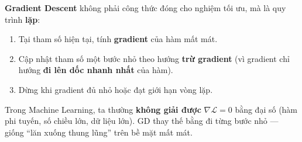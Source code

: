 \begin{dongco}[title={Bản chất Gradient Descent}]
\textbf{Gradient Descent} không phải công thức đóng cho nghiệm tối ưu, mà là quy trình \textbf{lặp}:
\begin{enumerate}
  \item Tại tham số hiện tại, tính \textbf{gradient} của hàm mất mát.
  \item Cập nhật tham số một bước nhỏ theo hướng \textbf{trừ gradient} (vì gradient chỉ hướng \textbf{đi lên dốc nhanh nhất} của hàm).
  \item Dừng khi gradient đủ nhỏ hoặc đạt giới hạn vòng lặp.
\end{enumerate}
Trong Machine Learning, ta thường \textbf{không giải được} $\nabla \mathcal{L} = 0$ bằng đại số (hàm phi tuyến, số chiều lớn, dữ liệu lớn). GD thay thế bằng đi từng bước nhỏ --- giống ``lăn xuống thung lũng'' trên bề mặt mất mát.
\end{dongco}

\newpage
